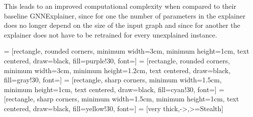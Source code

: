 
This leads to an improved computational complexity when compared to their baseline GNNExplainer, since for one the number of parameters in the explainer does no longer depend on the size of the input graph and since for another the explainer does not have to be retrained for every unexplained instance.

 = [rectangle, rounded corners, minimum width=3cm, minimum height=1cm, text centered, draw=black, fill=purple!30, font=\small]
 = [rectangle, rounded corners, minimum width=3cm, minimum height=1.2cm, text centered, draw=black, fill=gray!30, font=\small]
 = [rectangle, sharp corners, minimum width=1.5cm, minimum height=1cm, text centered, draw=black, fill=cyan!30, font=\small]
 = [rectangle, sharp corners, minimum width=1.5cm, minimum height=1cm, text centered, draw=black, fill=yellow!30, font=\small]
 = [very thick,->,>=Stealth]    %

